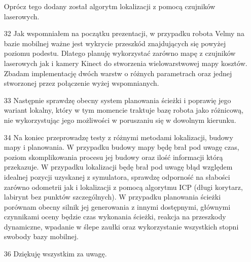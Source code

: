 \documentclass[10pt,a4paper]{article}
\begin{document}
\begin{itemize}
Oprócz tego dodany został algorytm lokalizacji z pomocą czujników laserowych.
		\item[32]
		Jak wspomniałem na początku prezentacji, w przypadku robota Velmy na bazie mobilnej ważne jest wykrycie przeszkód znajdujących się powyżej poziomu podestu.
Dlatego planuję wykorzystać zarówno mapę z czujników laserowych jak i kamery Kinect do stworzenia wielowarstwowej mapy kosztów. 
Zbadam implementację dwóch warstw o różnych parametrach oraz jednej stworzonej przez połączenie wyżej wspomnianych.
		\item[33]
		Następnie sprawdzę obecny system planowania ścieżki i poprawię jego wariant lokalny, który w tym momencie traktuje bazę robota jako różnicową, nie wykorzystując jego możliwości w poruszaniu się w dowolnym kierunku.
		\item[34]
		Na koniec przeprowadzę testy z różnymi metodami lokalizacji, budowy mapy i planowania.
W przypadku budowy mapy będę brał pod uwagę czas, poziom skomplikowania procesu jej budowy oraz ilość informacji którą przekazuje.
W przypadku lokalizacji będę brał pod uwagę błąd względem idealnej pozycji uzyskanej z symulatora, sprawdzę odporność na słabości zarówno odometrii jak i lokalizacji z pomocą algorytmu ICP (długi korytarz, labirynt bez punktów szczególnych).
W przypadku planowania ścieżki porównam obecny silnik jej generowania z innymi dostępnymi, głównymi czynnikami oceny będzie czas wykonania ścieżki, reakcja na przeszkody dynamiczne, wpadanie w ślepe zaułki oraz wykorzystanie wszystkich stopni swobody bazy mobilnej.
	\item[36]
	Dziękuję wszystkim za uwagę.

\printbibliography
	\end{itemize}
\end{document}
